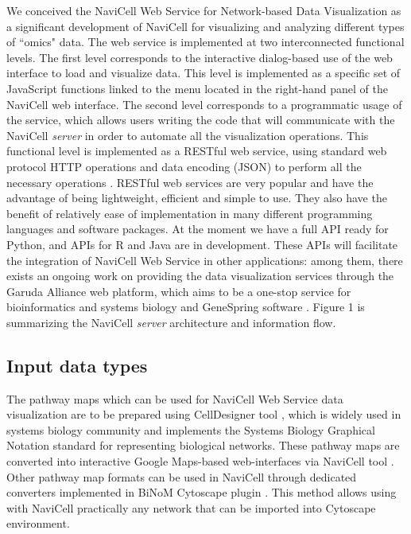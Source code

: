\documentclass[a4,center,fleqn]{NAR}
\begin{document}
We conceived the NaviCell Web Service for Network-based Data Visualization
as a significant development of NaviCell \cite{kuperstein2013navicell}
for visualizing and analyzing different types of ``omics" data. The web service
is implemented at two interconnected functional levels.
The first level corresponds to the interactive dialog-based
use of the web interface to load and visualize data. This level is implemented
as a specific set of JavaScript functions linked to the menu located
in the right-hand panel of the NaviCell web interface. The second level corresponds to a
programmatic usage of the service, which allows users writing the code that will
communicate with the NaviCell \emph{server} in order to automate all the
visualization operations. This functional level is implemented as a RESTful web
service, using standard web protocol HTTP operations and data encoding (JSON)
to perform all the necessary operations \cite{fielding2002principled}.
RESTful web services are very popular and have the advantage of being
lightweight, efficient and simple to use. They also have the benefit of
relatively ease of implementation in many different programming languages and
software packages. At the moment we have a full API ready for Python, and
APIs for R and Java are in development. These APIs will facilitate the integration
of NaviCell Web Service in other applications: among them, there exists an
ongoing work on providing the data visualization services through the Garuda
Alliance web platform, which aims to be a one-stop service for bioinformatics
and systems biology \cite{ghosh2011software} and GeneSpring software
\cite{Chu2001}. Figure 1 is summarizing the NaviCell \emph{server} architecture
and information flow.

\subsection{Input data types}

The pathway maps which can be used for NaviCell Web Service data visualization
are to be prepared using CellDesigner tool \cite{Funahashi2008}, which is widely used in systems biology
community and implements the Systems Biology Graphical Notation standard \cite{LeNovere2009}
for representing biological networks. These pathway maps are converted into
interactive Google Maps-based web-interfaces via NaviCell tool \cite{kuperstein2013navicell}.
Other pathway map formats can be used in NaviCell through dedicated converters implemented
in BiNoM Cytoscape plugin \cite{Zinovyev2008,Bonnet2013a}.
This method allows using with NaviCell practically any network that can be imported into Cytoscape environment.
\end{document}
